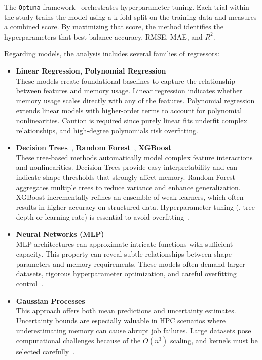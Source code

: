 The \texttt{Optuna} framework~\cite{akiba2019optuna} orchestrates hyperparameter tuning.
Each trial within the study trains the model using a k-fold split on the training data and measures a combined score.
By maximizing that score, the method identifies the hyperparameters that best balance accuracy, \ac{RMSE}, \ac{MAE}, and \(R^2\).

Regarding models, the analysis includes several families of regressors:

\begin{itemize}
    \item \textbf{Linear Regression, Polynomial Regression}~\cite{hastie2009elements}\\
    These models create foundational baselines to capture the relationship between features and memory usage.
    Linear regression indicates whether memory usage scales directly with any of the features.
    Polynomial regression extends linear models with higher-order terms to account for polynomial nonlinearities.
    Caution is required since purely linear fits underfit complex relationships, and high-degree polynomials risk overfitting.

    \item \textbf{Decision Trees}~\cite{breiman1984classification}, \textbf{Random Forest}~\cite{breiman2001random}, \textbf{\ac{XGBoost}}~\cite{chen2016xgboost}\\
    These tree-based methods automatically model complex feature interactions and nonlinearities.
    Decision Trees provide easy interpretability and can indicate shape thresholds that strongly affect memory.
    Random Forest aggregates multiple trees to reduce variance and enhance generalization.
    \ac{XGBoost} incrementally refines an ensemble of weak learners, which often results in higher accuracy on structured data.
    Hyperparameter tuning (\eg, tree depth or learning rate) is essential to avoid overfitting~\cite{bergstra2012}.

    \item \textbf{Neural Networks (\ac{MLP})}~\cite{rumelhart1986learning}\\
    \ac{MLP} architectures can approximate intricate functions with sufficient capacity.
    This property can reveal subtle relationships between shape parameters and memory requirements.
    These models often demand larger datasets, rigorous hyperparameter optimization, and careful overfitting control~\cite{lecun2015deep}.

    \item \textbf{Gaussian Processes}~\cite{rasmussen2006gaussian}\\
    This approach offers both mean predictions and uncertainty estimates.
    Uncertainty bounds are especially valuable in \ac{HPC} scenarios where underestimating memory can cause abrupt job failures.
    Large datasets pose computational challenges because of the \(O(n^3)\) scaling, and kernels must be selected carefully~\cite{quinonero2005}.


\end{itemize}
